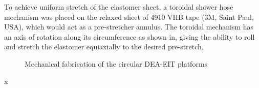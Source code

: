 	To achieve uniform stretch of the elastomer sheet, a toroidal shower hose mechanism was placed on the relaxed sheet of 4910 VHB tape (3M, Saint Paul, USA), which would act as a pre-stretcher annulus. The toroidal mechanism has an axis of rotation along its circumference as shown in, giving the ability to roll and stretch the elastomer equiaxially to the desired pre-stretch. 
	\begin{figure}[H]
		\centering
		\hspace{1cm}
        \hspace{1cm}
		\vspace{0.2cm}
		\caption{Mechanical fabrication of the circular DEA-EIT platforms}
		\label{fig:DEA_components}
	\end{figure}x
	
